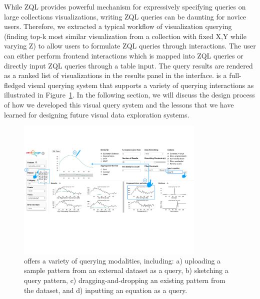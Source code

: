 \par While ZQL provides powerful mechanism for expressively specifying queries on large collections visualizations, writing ZQL queries can be daunting for novice users. Therefore, we extracted a typical workflow of visualization querying (finding top-k most similar visualization from a collection with fixed X,Y while varying Z) to allow users to formulate ZQL queries through interactions. The user can either perform frontend interactions which is mapped into ZQL queries or directly input ZQL queries through a table input. The query results are rendered as a ranked list of visualizations in the results panel in the interface. \zv is a full-fledged visual querying system that supports a variety of querying interactions as illustrated in Figure~\ref{fig:modalities}. In the following section, we will discuss the design process of how we developed this visual query system and the lessons that we have learned for designing future visual data exploration systems.

\begin{figure}[h!]
\centering
\includegraphics[width=0.8\textwidth]{figures/modalities.pdf}
\caption{\zv offers a variety of querying modalities, including: a) uploading a sample pattern from an external dataset as a query, b) sketching a query pattern, c) dragging-and-dropping an existing pattern from the dataset, and d) inputting an equation as a query.}
\label{fig:modalities}
\end{figure}
